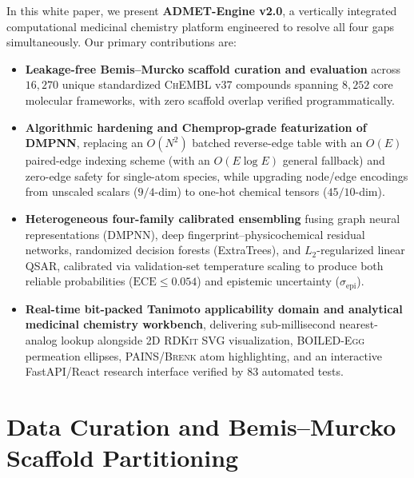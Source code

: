 \documentclass[10pt,twocolumn,letterpaper]{article}
\newcommand{\sige}{\sigma_{\mathrm{epi}}}
\begin{document}
In this white paper, we present \textbf{ADMET-Engine v2.0}, a vertically integrated computational medicinal chemistry platform engineered to resolve all four gaps simultaneously. Our primary contributions are:
\begin{itemize}
  \item \textbf{Leakage-free Bemis–Murcko scaffold curation and evaluation} across $16{,}270$ unique standardized \textsc{ChEMBL} v37 compounds spanning $8{,}252$ core molecular frameworks, with zero scaffold overlap verified programmatically.
  \item \textbf{Algorithmic hardening and Chemprop-grade featurization of \textsc{DMPNN}}, replacing an $O(N^2)$ batched reverse-edge table with an $O(E)$ paired-edge indexing scheme (with an $O(E\log E)$ general fallback) and zero-edge safety for single-atom species, while upgrading node/edge encodings from unscaled scalars ($9/4$-dim) to one-hot chemical tensors ($45/10$-dim).
  \item \textbf{Heterogeneous four-family calibrated ensembling} fusing graph neural representations (\textsc{DMPNN}), deep fingerprint–physicochemical residual networks, randomized decision forests (ExtraTrees), and $L_2$-regularized linear \textsc{QSAR}, calibrated via validation-set temperature scaling to produce both reliable probabilities ($\mathrm{ECE} \le 0.054$) and epistemic uncertainty ($\sige$).
  \item \textbf{Real-time bit-packed Tanimoto applicability domain and analytical medicinal chemistry workbench}, delivering sub-millisecond nearest-analog lookup alongside 2D \textsc{RDKit} \textsc{SVG} visualization, \textsc{BOILED-Egg} permeation ellipses, \textsc{PAINS}/\textsc{Brenk} atom highlighting, and an interactive FastAPI/React research interface verified by $83$ automated tests.
\end{itemize}

\section{Data Curation and Bemis–Murcko Scaffold Partitioning}
\end{document}
